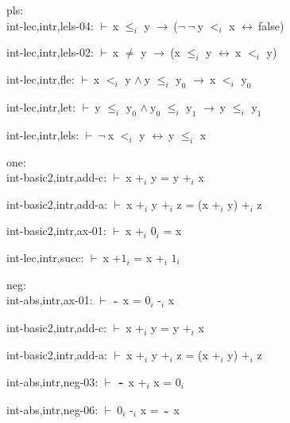 \documentclass[a4paper]{article}
\newcommand{\tildesym}{\raisebox{-4pt}{\bf\~{}}}
\newcommand{\Fol}{\mbox{$\vdash\ $}}
\newcommand{\Not}{\mbox{$\neg\ $}}
\newcommand{\And}{\mbox{$\wedge\ $}}
\newcommand{\Imp}{\mbox{$\rightarrow\ $}}
\newcommand{\Equiv}{\mbox{$\leftrightarrow\ $}}
\begin{document}
\bigskip

pls:\\ int-lec,intr,lels-04: 
 \Fol x $\mbox{$\le$}_{i}$ y \Imp (\Not \Not y $\mbox{$<$}_{i}$ x \Equiv false)



int-lec,intr,lels-02: 
 \Fol x $\neq$ y \Imp (x $\mbox{$\le$}_{i}$ y \Equiv x $\mbox{$<$}_{i}$ y)



int-lec,intr,fle: 
 \Fol x $\mbox{$<$}_{i}$ y \And y $\mbox{$\le$}_{i}$ $\mbox{y}_{0}$ \Imp x $\mbox{$<$}_{i}$ $\mbox{y}_{0}$



int-lec,intr,let: 
 \Fol y $\mbox{$\le$}_{i}$ $\mbox{y}_{0}$ \And $\mbox{y}_{0}$ $\mbox{$\le$}_{i}$ $\mbox{y}_{1}$ \Imp y $\mbox{$\le$}_{i}$ $\mbox{y}_{1}$



int-lec,intr,lels: 
 \Fol \Not x $\mbox{$<$}_{i}$ y \Equiv y $\mbox{$\le$}_{i}$ x



\bigskip

one:\\ int-basic2,intr,add-c: 
 \Fol x $\mbox{+}_{i}$ y = y $\mbox{+}_{i}$ x



int-basic2,intr,add-a: 
 \Fol x $\mbox{+}_{i}$ y $\mbox{+}_{i}$ z = (x $\mbox{+}_{i}$ y) $\mbox{+}_{i}$ z



int-basic2,intr,ax-01: 
 \Fol x $\mbox{+}_{i}$ $\mbox{0}_{i}$ = x



int-lec,intr,succ: 
 \Fol x $\mbox{+1}_{i}$ = x $\mbox{+}_{i}$ $\mbox{1}_{i}$



\bigskip

neg:\\ int-abs,intr,ax-01: 
 \Fol $\tildesym$ x = $\mbox{0}_{i}$ $\mbox{-}_{i}$ x

int-basic2,intr,add-c: 
 \Fol x $\mbox{+}_{i}$ y = y $\mbox{+}_{i}$ x



int-basic2,intr,add-a: 
 \Fol x $\mbox{+}_{i}$ y $\mbox{+}_{i}$ z = (x $\mbox{+}_{i}$ y) $\mbox{+}_{i}$ z



int-abs,intr,neg-03: 
 \Fol $\tildesym$ x $\mbox{+}_{i}$ x = $\mbox{0}_{i}$



int-abs,intr,neg-06: 
 \Fol $\mbox{0}_{i}$ $\mbox{-}_{i}$ x = $\tildesym$ x
\end{document}
